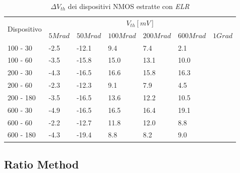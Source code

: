\documentclass[12pt, letterpaper]{book}
\begin{document}
\begin{table}[H]
  \renewcommand{\arraystretch}{1.3}
    \begin{tabular}{m{2cm}  m{1.1cm} m{1.3cm} m{1.5cm} m{1.5cm} m{1.5cm} m{1cm}}
      \toprule
      \multirow{2}{*}{Dispositivo} & \multicolumn{6}{c}{$V_{th} [mV] $}                                                                    \\
      \cmidrule{2-7}
                                   & $5Mrad$		& $50Mrad$& $100Mrad$ & $200Mrad$ & $600Mrad$ & $1Grad$ \\
      \midrule
      100 - 30               	& -2.5		& -12.1		& 9.4		& 7.4		& 2.1		&    \\
      \hline
      100 - 60                 	& -3.5		& -15.8		& 15.0		& 13.1		& 10.0		&    \\
      \hline
      200 - 30                  	& -4.3		& -16.5		& 16.6		&15.8		& 16.3		&    \\
      \hline
      200 - 60                    & -2.3		& -12.3		& 9.1		& 7.9		& 4.5		&   \\
      \hline
      200 - 180 			& -3.5		& -16.5 		& 13.6		&12.2		& 10.5		&    \\
      \hline
      600 - 30                  	& -4.9		& -16.5		& 16.5		& 16.4		& 19.1		&    \\
      \hline
      600 - 60                    & -2.2  		& -12.7		& 11.8		& 12.0		& 8.8		&   \\
      \hline
      600 - 180              	& -4.3  		& -19.4		& 8.8		& 8.2		& 9.0		&  \\
      \bottomrule
    \end{tabular}
  \caption{$\Delta V_{th}$ dei dispositivi NMOS estratte con \emph{ELR}}
  \label{tab:deltaVthELRN}
\end{table}






\subsection{Ratio Method}
\end{document}
